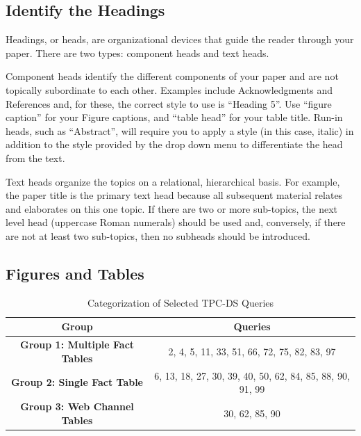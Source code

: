 \documentclass[conference]{IEEEtran}
\begin{document}
\subsection{Identify the Headings}
Headings, or heads, are organizational devices that guide the reader through
your paper. There are two types: component heads and text heads.

Component heads identify the different components of your paper and are not
topically subordinate to each other. Examples include Acknowledgments and
References and, for these, the correct style to use is ``Heading 5''. Use
``figure caption'' for your Figure captions, and ``table head'' for your
table title. Run-in heads, such as ``Abstract'', will require you to apply a
style (in this case, italic) in addition to the style provided by the drop
down menu to differentiate the head from the text.

Text heads organize the topics on a relational, hierarchical basis. For
example, the paper title is the primary text head because all subsequent
material relates and elaborates on this one topic. If there are two or more
sub-topics, the next level head (uppercase Roman numerals) should be used
and, conversely, if there are not at least two sub-topics, then no subheads
should be introduced.

\subsection{Figures and Tables}
\begin{table}[htbp]
	\caption{Categorization of Selected TPC-DS Queries}
	\begin{center}
		\begin{tabular}{|c|c|}
			\hline
			\textbf{Group}                         & \textbf{Queries}                                          \\
			\hline
			\textbf{Group 1: Multiple Fact Tables} & 2, 4, 5, 11, 33, 51, 66, 72, 75, 82, 83, 97               \\
			\hline
			\textbf{Group 2: Single Fact Table}    & 6, 13, 18, 27, 30, 39, 40, 50, 62, 84, 85, 88, 90, 91, 99 \\
			\hline
			\textbf{Group 3: Web Channel Tables}   & 30, 62, 85, 90                                            \\
			\hline
		\end{tabular}
		\label{table:query-categorization}
	\end{center}
\end{table}
\end{document}
